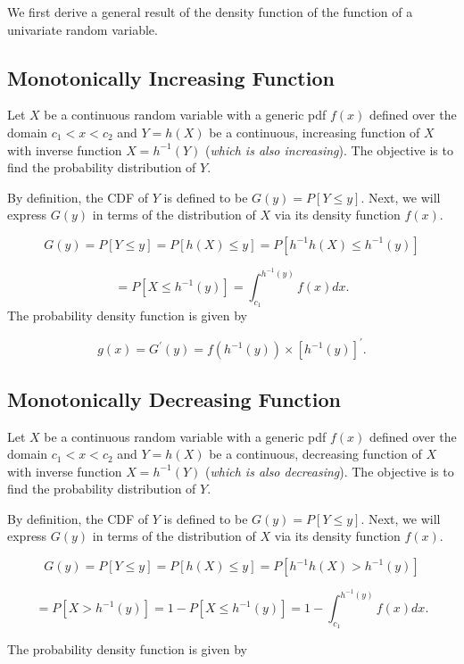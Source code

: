\documentclass[
]{book}
\begin{document}
We first derive a general result of the density function of the function of a univariate random variable.

\hypertarget{monotonically-increasing-function}{%
\subsection{Monotonically Increasing Function}\label{monotonically-increasing-function}}

Let \(X\) be a continuous random variable with a generic pdf \(f(x)\) defined over the domain \(c_1 < x < c_2\) and \(Y=h(X)\) be a continuous, increasing function of \(X\) with inverse function \(X=h^{-1} (Y)\) (\emph{\color{red}which is also increasing}). The objective is to find the probability distribution of \(Y\).

By definition, the CDF of \(Y\) is defined to be \(G(y) = P[Y \le y]\). Next, we will express \(G(y)\) in terms of the distribution of \(X\) via its density function \(f(x)\).

\[
G(y) = P[Y \le y] = P[h(X) \le y] = P[h^{-1}h(X) \le h^{-1}(y)]
\]

\[
=P[X \le h^{-1}(y)]=\int_{c_1}^{h^{-1}(y)} f(x)dx.
\] The probability density function is given by

\[
g(x) = G^\prime (y) = f(h^{-1}(y))\times [h^{-1}(y)]^\prime.
\]

\hypertarget{monotonically-decreasing-function}{%
\subsection{Monotonically Decreasing Function}\label{monotonically-decreasing-function}}

Let \(X\) be a continuous random variable with a generic pdf \(f(x)\) defined over the domain \(c_1 < x < c_2\) and \(Y=h(X)\) be a continuous, decreasing function of \(X\) with inverse function \(X=h^{-1} (Y)\) (\emph{\color{blue}which is also decreasing}). The objective is to find the probability distribution of \(Y\).

By definition, the CDF of \(Y\) is defined to be \(G(y) = P[Y \le y]\). Next, we will express \(G(y)\) in terms of the distribution of \(X\) via its density function \(f(x)\).

\[
G(y) = P[Y \le y] = P[h(X) \le y] = P[h^{-1}h(X) > h^{-1}(y)]
\]

\[
=P[X > h^{-1}(y)]= 1 - P[X \le h^{-1}(y)] = 1 - \int_{c_1}^{h^{-1}(y)} f(x)dx.
\]

The probability density function is given by
\end{document}

